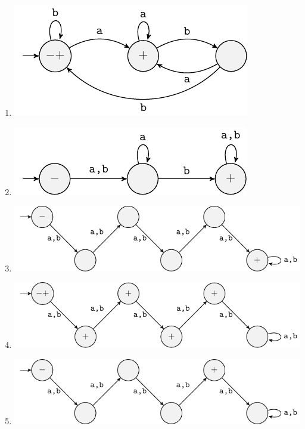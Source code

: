 \begin{solution}
    \begin{enumerate}[label=\textbf{\alph*)}]
        \item \includegraphics[]{figures/answer/Answer1-A.pdf}
        \\
        \item \includegraphics[]{figures/answer/Answer1-B.pdf}
        \newpage
        \item \includegraphics[]{figures/answer/Answer1-C.pdf}
        \\
        \item \includegraphics[]{figures/answer/Answer1-D.pdf}
        \\
        \item \includegraphics[]{figures/answer/Answer1-E.pdf}

\end{enumerate}
\end{solution}
